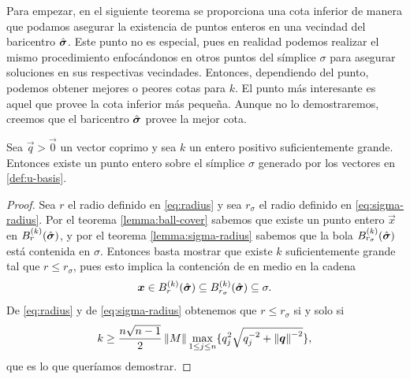 Para empezar, en el siguiente teorema se proporciona una cota
inferior de manera que podamos asegurar la existencia de puntos enteros en una vecindad del
baricentro $\hat{\boldsymbol{ \sigma }}$. Este punto no es especial, pues en realidad podemos realizar el mismo
procedimiento enfocándonos en otros puntos del símplice $\sigma$ para asegurar soluciones en sus
respectivas vecindades. Entonces, dependiendo del punto, podemos obtener mejores o peores cotas para
$k$. El punto más interesante es aquel que provee la cota inferior más pequeña. Aunque no lo
demostraremos, creemos que el baricentro $\hat{\boldsymbol{ \sigma }}$ provee la mejor cota.

\begin{theorem}
	\label{th:intsimplex}
	Sea $\vec{q} > \vec{0}$ un vector coprimo y sea $k$ un entero positivo suficientemente grande.
	Entonces existe un punto entero sobre el símplice $\sigma$ generado por los vectores en
	\eqref{def:u-basis}.
\end{theorem}
\begin{proof}
	Sea $r$ el radio definido en \eqref{eq:radius} y sea $r_\sigma$ el radio definido en
	\eqref{eq:sigma-radius}. Por el teorema \ref{lemma:ball-cover} sabemos que existe un punto
	entero $\vec{x}$ en $B_r^{(k)}(\hat{\boldsymbol{ \sigma }})$, y por el teorema \ref{lemma:sigma-radius} sabemos
	que la bola $B_{r_\sigma}^{(k)}(\hat{\boldsymbol{ \sigma }})$ está contenida en $\sigma$. Entonces basta
	mostrar que existe $k$ suficientemente grande tal que $r \leq r_\sigma$, pues esto implica la
	contención de en medio en la cadena
	\begin{equation*}
		\boldsymbol{x} \in B_r^{(k)}(\hat{\boldsymbol{ \sigma }}) \subseteq B_{r_\sigma}^{(k)}(\hat{\boldsymbol{ \sigma }}) \subseteq \sigma.
	\end{equation*}
	De \eqref{eq:radius} y de \eqref{eq:sigma-radius} obtenemos que $r \leq r_\sigma$ si y solo si
	\begin{equation}
		\label{eq:eta-limit}
		k \geq \frac{n\sqrt{n - 1}}{2}\left\lVert M \right\rVert \max_{1 \leq j \leq n} \lbrace q_j^2 \sqrt{q_j^{-2} + \left\lVert \boldsymbol{q} \right\rVert^{-2}} \rbrace,
	\end{equation}
	que es lo que queríamos demostrar.
\end{proof}

